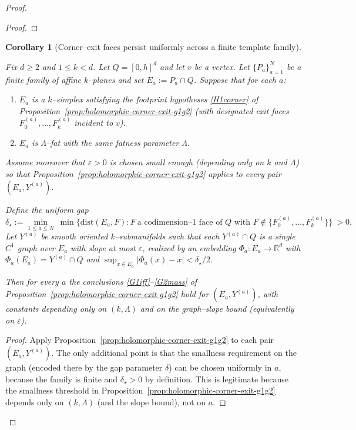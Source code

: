 \documentclass[11pt]{article}
\numberwithin{equation}{section}  %
\theoremstyle{plain}
\newtheorem{corollary}[theorem]{Corollary}
\theoremstyle{definition}
\theoremstyle{remark}
\newcommand{\R}{\mathbb{R}}
\newcommand{\dist}{\mathrm{dist}}
\begin{document}
\begin{proof}
\begin{proof}
\end{proof}


\begin{corollary}[{Corner--exit faces persist uniformly across a finite template family}]\label{cor:holomorphic-corner-exit-inherits}

Fix $d\ge 2$ and $1\le k<d$.  Let $Q=[0,h]^d$ and let $v$ be a vertex.
Let $\{P_a\}_{a=1}^N$ be a finite family of affine $k$--planes and set $E_a:=P_a\cap Q$.
Suppose that for each $a$:
\begin{enumerate}
\item[\textup{(T1)}]\label{T1}
$E_a$ is a $k$--simplex satisfying the footprint hypotheses \eqref{H1corner} of Proposition~\ref{prop:holomorphic-corner-exit-g1g2}
(with designated exit faces $F_0^{(a)},\dots,F_k^{(a)}$ incident to $v$).
\item[\textup{(T2)}]\label{T2}
$E_a$ is $\Lambda$--fat with the same fatness parameter $\Lambda$.
\end{enumerate}
Assume moreover that $\varepsilon>0$ is chosen small enough (depending only on $k$ and $\Lambda$) so that Proposition~\ref{prop:holomorphic-corner-exit-g1g2} applies to every pair $(E_a,Y^{(a)})$.

Define the uniform gap
\[
\delta_\star:=\min_{1\le a\le N}\ \min\{\dist(E_a,F): F\ \text{a codimension--$1$ face of $Q$ with }F\notin\{F_0^{(a)},\dots,F_k^{(a)}\}\}\ >0.
\]
Let $Y^{(a)}$ be smooth oriented $k$--submanifolds such that each $Y^{(a)}\cap Q$ is a single $C^1$ graph over $E_a$
with slope at most $\varepsilon$, realized by an embedding $\Phi_a:E_a\to\R^d$ with $\Phi_a(E_a)=Y^{(a)}\cap Q$ and
$\sup_{x\in E_a}|\Phi_a(x)-x|<\delta_\star/2$.

Then for every $a$ the conclusions \eqref{G1iff}--\eqref{G2mass} of Proposition~\ref{prop:holomorphic-corner-exit-g1g2} hold for $(E_a,Y^{(a)})$,
with constants depending only on $(k,\Lambda)$ and on the graph--slope bound (equivalently on $\varepsilon$).

\end{corollary}

\begin{proof}

Apply Proposition~\ref{prop:holomorphic-corner-exit-g1g2} to each pair $(E_a,Y^{(a)})$.
The only additional point is that the smallness requirement on the graph (encoded there by the gap parameter $\delta$) can be chosen uniformly in $a$,
because the family is finite and $\delta_\star>0$ by definition.
This is legitimate because the smallness threshold in Proposition~\ref{prop:holomorphic-corner-exit-g1g2} depends only on $(k,\Lambda)$ (and the slope bound), not on $a$.


\end{proof}
\end{proof}
\end{document}
